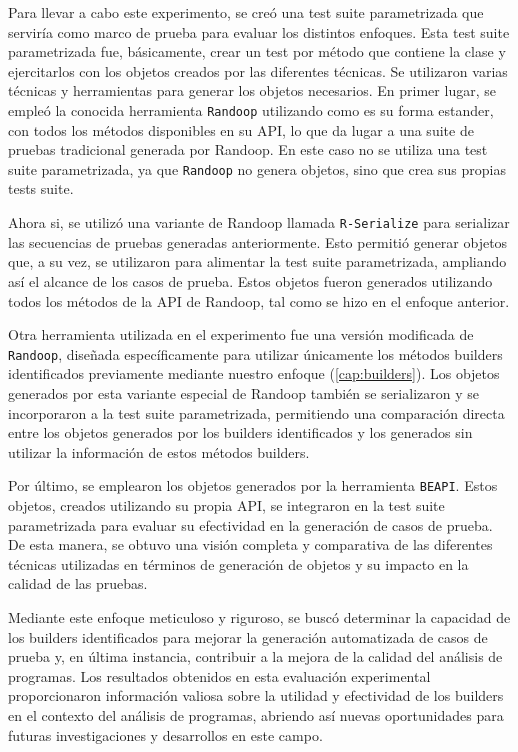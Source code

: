 Para llevar a cabo este experimento, se creó una test suite parametrizada que serviría como marco de prueba para evaluar los distintos enfoques. Esta test suite parametrizada fue, básicamente, crear un test por método que contiene la clase y ejercitarlos con los objetos creados por las diferentes técnicas. Se utilizaron varias técnicas y herramientas para generar los objetos necesarios. En primer lugar, se empleó la conocida herramienta \texttt{Randoop} utilizando como es su forma estander, con todos los métodos disponibles en su API, lo que da lugar a una suite de pruebas tradicional generada por Randoop. En este caso no se utiliza una test suite parametrizada, ya que \texttt{Randoop}  no genera objetos, sino que crea sus propias tests suite.

Ahora si, se utilizó una variante de Randoop llamada \texttt{R-Serialize} para serializar las secuencias de pruebas generadas anteriormente. Esto permitió generar objetos que, a su vez, se utilizaron para alimentar la test suite parametrizada, ampliando así el alcance de los casos de prueba. Estos objetos fueron generados utilizando todos los métodos de la API de Randoop, tal como se hizo en el enfoque anterior.

Otra herramienta utilizada en el experimento fue una versión modificada de \texttt{Randoop}, diseñada específicamente para utilizar únicamente los métodos builders identificados previamente mediante nuestro enfoque (\ref{cap:builders}). Los objetos generados por esta variante especial de Randoop también se serializaron y se incorporaron a la test suite parametrizada, permitiendo una comparación directa entre los objetos generados por los builders identificados y los generados sin utilizar la información de estos métodos builders.

Por último, se emplearon los objetos generados por la herramienta \texttt{BEAPI}. Estos objetos, creados utilizando su propia API, se integraron en la test suite parametrizada para evaluar su efectividad en la generación de casos de prueba. De esta manera, se obtuvo una visión completa y comparativa de las diferentes técnicas utilizadas en términos de generación de objetos y su impacto en la calidad de las pruebas.

Mediante este enfoque meticuloso y riguroso, se buscó determinar la capacidad de los builders identificados para mejorar la generación automatizada de casos de prueba y, en última instancia, contribuir a la mejora de la calidad del análisis de programas. Los resultados obtenidos en esta evaluación experimental proporcionaron información valiosa sobre la utilidad y efectividad de los builders en el contexto del análisis de programas, abriendo así nuevas oportunidades para futuras investigaciones y desarrollos en este campo.

